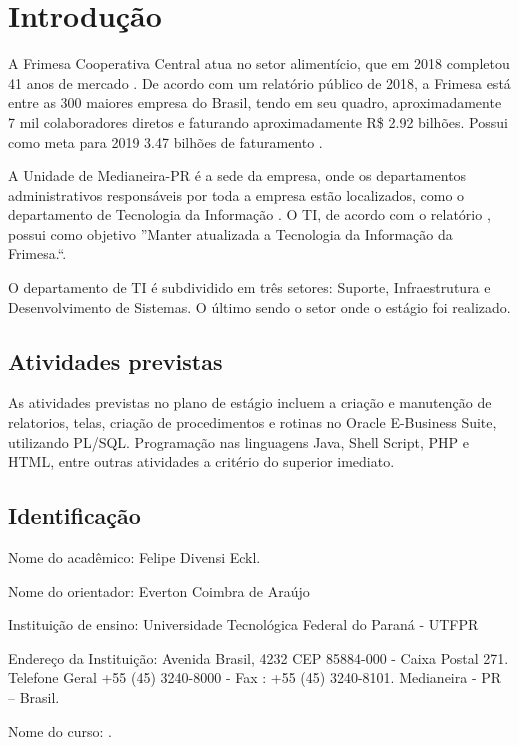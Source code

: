 \chapter{Introdução}\label{ch:intro}

A Frimesa Cooperativa Central atua no setor alimentício, que em 2018 completou 41 anos de mercado \cite{relatorio2018}. De acordo com um relatório público de 2018, a Frimesa está entre as 300 maiores empresa do Brasil, tendo em seu quadro, aproximadamente 7 mil colaboradores diretos e faturando aproximadamente R\$ 2.92 bilhões. Possui como meta para 2019 3.47 bilhões de faturamento \cite{relatorio2018}.

A Unidade de Medianeira-PR é a sede da empresa, onde os departamentos administrativos responsáveis por toda a empresa estão localizados, como o departamento de Tecnologia da Informação . O TI, de acordo com o relatório , possui como objetivo ''Manter atualizada a Tecnologia da Informação da Frimesa.``.

O departamento de TI é subdividido em três setores: Suporte, Infraestrutura e Desenvolvimento de Sistemas. O último sendo o setor onde o estágio foi realizado.

\section{Atividades previstas}

As atividades previstas no plano de estágio incluem a criação e manutenção de relatorios, telas, criação de procedimentos e rotinas no Oracle E-Business Suite, utilizando PL/SQL. Programação nas linguagens Java, Shell Script, PHP e HTML, entre outras atividades a critério do superior imediato.

\section{Identificação}

Nome do acadêmico: Felipe Divensi Eckl.

Nome do orientador: Everton Coimbra de Araújo

Instituição de ensino: Universidade Tecnológica Federal do Paraná - UTFPR

Endereço da Instituição: 
Avenida Brasil, 4232 CEP 85884-000 - Caixa Postal 271.
Telefone Geral +55 (45) 3240-8000 - Fax : +55 (45) 3240-8101.
Medianeira - PR – Brasil.

Nome do curso: \UTFPRprogramadata.

